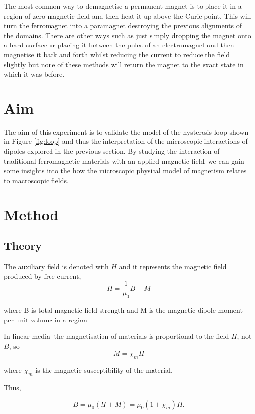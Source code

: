 \documentclass{article}
\begin{document}
The most common way to demagnetise a permanent magnet is to place it in a region of zero magnetic
field and then heat it up above the Curie point. This will turn the ferromagnet into a paramagnet 
destroying the previous alignments of the domains. There are other ways such as just simply dropping
the magnet onto a hard surface or placing it between the poles of an electromagnet and then magnetise
it back and forth whilst reducing the current to reduce the field slightly but none of these methods
will return the magnet to the exact state in which it was before.

\section{Aim}
The aim of this experiment is to validate the model of the hysteresis loop shown in Figure \ref{fig:loop}
and thus the interpretation of the microscopic interactions of dipoles explored in the previous section.
By studying the interaction of traditional ferromagnetic materials with an applied magnetic field, we can
gain some insights into the how the microscopic physical model of magnetism relates to macroscopic fields.

\section{Method}
\subsection{Theory}
The auxiliary field is denoted with $H$ and it represents the magnetic field produced by free current,
\begin{equation}
    H = \frac{1}{\mu_0}B-M
\end{equation}

where B is total magnetic field strength and M is the magnetic dipole moment per unit volume in a region.

In linear media, the magnetisation of materials is proportional to the field $H$, not $B$, so
\begin{equation}
    M = \chi_m H
\end{equation}

where $\chi_m$ is the magnetic susceptibility of the material. 

Thus,

\begin{equation}
    B=\mu_0(H+M)=\mu_0(1+\chi_m)H.
\end{equation}
\end{document}

